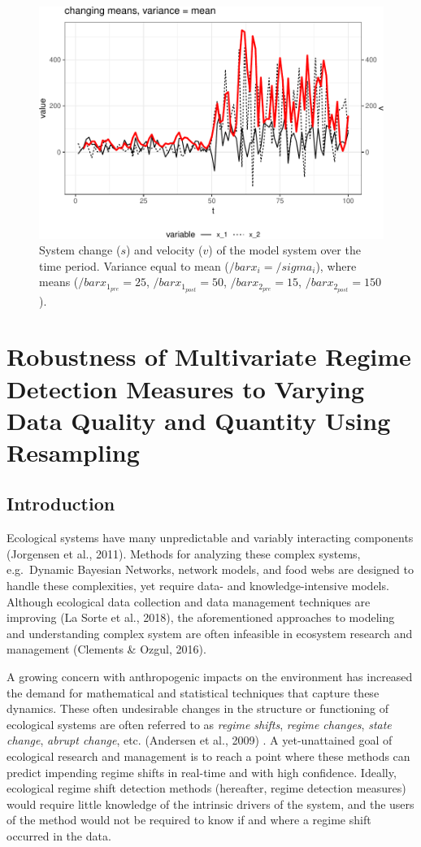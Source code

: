 \documentclass[12pt,twoside,openany]{reedthesis}
\begin{document}
\begin{figure}
\includegraphics[width=0.85\linewidth]{_myDissertation_files/figure-latex/velocSysEx4-1} \caption{System change ($s$) and velocity ($v$) of the model system over the time period. Variance equal to mean ($/bar{x_i}=/sigma_i$), where means ($/bar{x}_{1_{pre}}=25$, $/bar{x}_{1_{post}}=50$, $/bar{x}_{2_{pre}}=15$, $/bar{x}_{2_{post}}=150$).}\label{fig:velocSysEx4}
\end{figure}
\hypertarget{resampling}{%
\chapter{Robustness of Multivariate Regime Detection Measures to Varying Data Quality and Quantity Using Resampling}\label{resampling}}

\hypertarget{introduction-4}{%
\section{Introduction}\label{introduction-4}}

Ecological systems have many unpredictable and variably interacting components (Jorgensen et al., 2011). Methods for analyzing these complex systems, e.g.~Dynamic Bayesian Networks, network models, and food webs are designed to handle these complexities, yet require data- and knowledge-intensive models. Although ecological data collection and data management techniques are improving (La Sorte et al., 2018), the aforementioned approaches to modeling and understanding complex system are often infeasible in ecosystem research and management (Clements \& Ozgul, 2016).

A growing concern with anthropogenic impacts on the environment has increased the demand for mathematical and statistical techniques that capture these dynamics. These often undesirable changes in the structure or functioning of ecological systems are often referred to as \emph{regime shifts}, \emph{regime changes}, \emph{state change}, \emph{abrupt change}, etc. (Andersen et al., 2009) . A yet-unattained goal of ecological research and management is to reach a point where these methods can predict impending regime shifts in real-time and with high confidence. Ideally, ecological regime shift detection methods (hereafter, regime detection measures) would require little knowledge of the intrinsic drivers of the system, and the users of the method would not be required to know if and where a regime shift occurred in the data.
\end{document}
